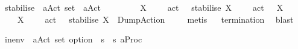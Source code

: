 \begin{isabellebody}
\begin{isamarkuptext}
\end{isamarkuptext}\isamarkuptrue%
\isamarkupfalse%
\ stabilise\ {\isacharcolon}{\kern0pt}{\isacharcolon}{\kern0pt}\ {\isacartoucheopen}{\isacharparenleft}{\kern0pt}{\isacharprime}{\kern0pt}a{\isacharparenright}{\kern0pt}Act{\isacharunderscore}{\kern0pt}{\isasymtheta}\ set\ {\isasymRightarrow}\ {\isacharparenleft}{\kern0pt}{\isacharprime}{\kern0pt}a{\isacharparenright}{\kern0pt}Act{\isacharunderscore}{\kern0pt}{\isasymtheta}{\isacartoucheclose}\isanewline
\ \ \ \isanewline
\ \ \ \ {\isacartoucheopen}{\isasymforall}\ {\isasymalpha}{\isasymin}X{\isachardot}{\kern0pt}\ {\isacharparenleft}{\kern0pt}{\isasymexists}\ {\isasymalpha}{\isacharprime}{\kern0pt}{\isachardot}{\kern0pt}\ {\isasymalpha}\ {\isacharequal}{\kern0pt}\ act\ {\isasymalpha}{\isacharprime}{\kern0pt}{\isacharparenright}{\kern0pt}\ {\isasymLongrightarrow}\ stabilise\ X\ {\isacharequal}{\kern0pt}\ {\isasymepsilon}\ {\isacharbraceleft}{\kern0pt}{\isasymalpha}{\isacharprime}{\kern0pt}\ {\isachardot}{\kern0pt}\ act\ {\isasymalpha}{\isacharprime}{\kern0pt}\ {\isasymin}\ X{\isacharbraceright}{\kern0pt}{\isacartoucheclose}\isanewline
\ \ {\isacharbar}{\kern0pt}\ {\isacartoucheopen}{\isasymexists}\ {\isasymalpha}{\isasymin}X{\isachardot}{\kern0pt}\ {\isacharparenleft}{\kern0pt}{\isasymnexists}\ {\isasymalpha}{\isacharprime}{\kern0pt}{\isachardot}{\kern0pt}\ {\isasymalpha}\ {\isacharequal}{\kern0pt}\ act\ {\isasymalpha}{\isacharprime}{\kern0pt}{\isacharparenright}{\kern0pt}\ {\isasymLongrightarrow}\ stabilise\ X\ {\isacharequal}{\kern0pt}\ DumpAction{\isacartoucheclose}\ \isanewline
%
\isadelimproof
\ \ %
\endisadelimproof
%
\isatagproof
{}\isamarkupfalse%
\ metis{\isacharplus}{\kern0pt}%
\endisatagproof
{\isafoldproof}%
%
\isadelimproof
\isanewline
%
\endisadelimproof
{}\isamarkupfalse%
%
\isadelimproof
\ %
\endisadelimproof
%
\isatagproof
{}\isamarkupfalse%
\ {\isachardoublequoteopen}termination{\isachardoublequoteclose}\ \isamarkupfalse%
\ blast%
\endisatagproof
{\isafoldproof}%
%
\isadelimproof
%
\endisadelimproof
%
\begin{isamarkuptext}%
\pagebreak%
\end{isamarkuptext}\isamarkuptrue%
\isamarkupfalse%
\ in{\isacharunderscore}{\kern0pt}env\ {\isacharcolon}{\kern0pt}{\isacharcolon}{\kern0pt}\ {\isacartoucheopen}{\isacharparenleft}{\kern0pt}{\isacharprime}{\kern0pt}a{\isacharparenright}{\kern0pt}Act{\isacharunderscore}{\kern0pt}{\isasymtheta}\ set\ option\ {\isasymRightarrow}\ {\isacharprime}{\kern0pt}s\ {\isasymRightarrow}\ {\isacharparenleft}{\kern0pt}{\isacharprime}{\kern0pt}s{\isacharcomma}{\kern0pt}\ {\isacharprime}{\kern0pt}a{\isacharparenright}{\kern0pt}Proc{\isacharunderscore}{\kern0pt}{\isasymtheta}{\isacartoucheclose}\isanewline

\end{isabellebody}
